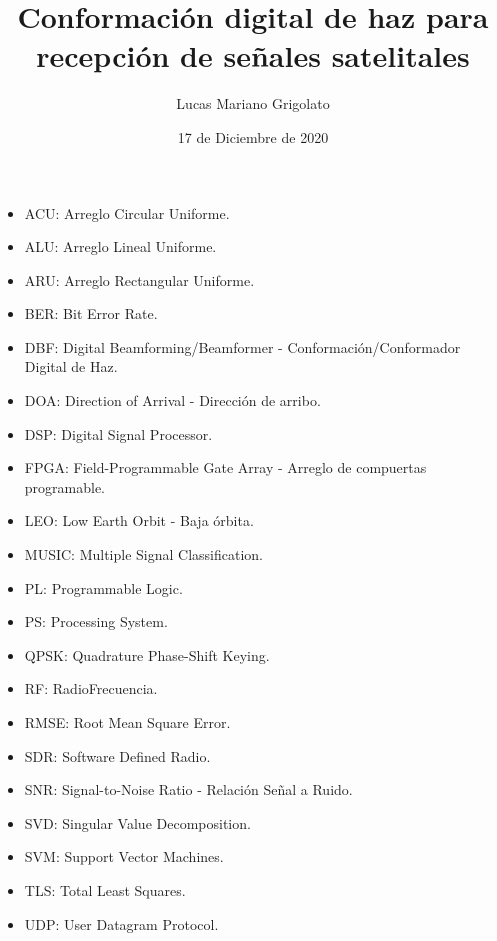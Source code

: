 \documentclass[screen,pagebackref]{ibtesis}
\title{Conformación digital de haz para recepción de señales satelitales}
\author{Lucas Mariano Grigolato}
\date{17 de Diciembre de 2020}
\begin{document}

\begin{preliminary}



    \begin{abreviaturas}
        \begin{itemize}
            \item ACU: Arreglo Circular Uniforme.
            \item ALU: Arreglo Lineal Uniforme.
            \item ARU: Arreglo Rectangular Uniforme.
            \item BER: Bit Error Rate.
            \item DBF: Digital Beamforming/Beamformer - Conformación/Conformador Digital de Haz.
            \item DOA: Direction of Arrival - Dirección de arribo.
            \item DSP: Digital Signal Processor.
            \item FPGA: Field-Programmable Gate Array - Arreglo de compuertas programable.
            \item LEO: Low Earth Orbit - Baja órbita.
            \item MUSIC: Multiple Signal Classification.
            \item PL: Programmable Logic.
            \item PS: Processing System.
            \item QPSK: Quadrature Phase-Shift Keying.
            \item RF: RadioFrecuencia.
            \item RMSE: Root Mean Square Error.
            \item SDR: Software Defined Radio.
            \item SNR: Signal-to-Noise Ratio - Relación Señal a Ruido.
            \item SVD: Singular Value Decomposition.
            \item SVM: Support Vector Machines.
            \item TLS: Total Least Squares.
            \item UDP: User Datagram Protocol.
        \end{itemize}

    \end{abreviaturas}

    \tableofcontents                %

    \listoffigures                  %

    \listoftables                   %

    

\end{preliminary}
\end{document}
